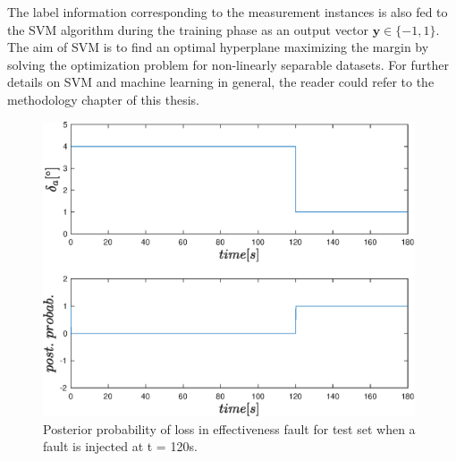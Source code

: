 The label information corresponding to the measurement instances is also fed to the SVM algorithm during the training phase as an output vector $\bm{y} \in \{-1,1\}$. 
The aim of SVM is to find an optimal hyperplane maximizing the margin by solving the optimization problem for non-linearly separable datasets. For further details on SVM and machine learning in general, the reader could refer to the methodology chapter of this thesis.

\begin{figure}
\begin{center}
\includegraphics[width=11cm]{figures/post_prob}    %
\caption{Posterior probability of loss in effectiveness fault for test set when a fault is injected at t = 120s.} 
\label{fig:post_prob}
\end{center}
\end{figure}

